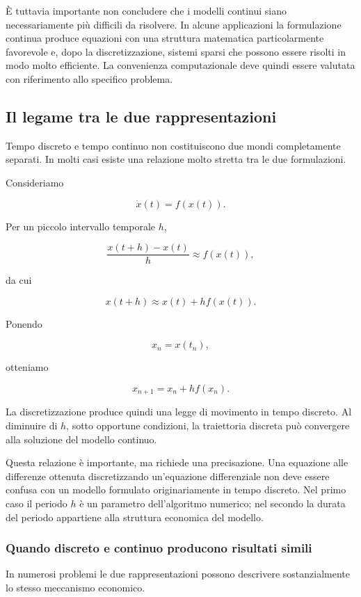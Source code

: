 \documentclass{book}
\begin{document}
È tuttavia importante non concludere che i modelli continui siano necessariamente più difficili da risolvere. In alcune applicazioni la formulazione continua produce equazioni con una struttura matematica particolarmente favorevole e, dopo la discretizzazione, sistemi sparsi che possono essere risolti in modo molto efficiente. La convenienza computazionale deve quindi essere valutata con riferimento allo specifico problema.

\subsection{Il legame tra le due rappresentazioni}

Tempo discreto e tempo continuo non costituiscono due mondi completamente separati. In molti casi esiste una relazione molto stretta tra le due formulazioni.

Consideriamo

$$
\dot x(t)=f(x(t)).
$$

Per un piccolo intervallo temporale $h$,

$$
\frac{x(t+h)-x(t)}{h}
\approx
f(x(t)),
$$

da cui

$$
x(t+h)
\approx
x(t)+h f(x(t)).
$$

Ponendo

$$
x_n=x(t_n),
$$

otteniamo

$$
x_{n+1}=x_n+h f(x_n).
$$

La discretizzazione produce quindi una legge di movimento in tempo discreto. Al diminuire di $h$, sotto opportune condizioni, la traiettoria discreta può convergere alla soluzione del modello continuo.

Questa relazione è importante, ma richiede una precisazione. Una equazione alle differenze ottenuta discretizzando un'equazione differenziale non deve essere confusa con un modello formulato originariamente in tempo discreto. Nel primo caso il periodo $h$ è un parametro dell'algoritmo numerico; nel secondo la durata del periodo appartiene alla struttura economica del modello.

\subsubsection{Quando discreto e continuo producono risultati simili}

In numerosi problemi le due rappresentazioni possono descrivere sostanzialmente lo stesso meccanismo economico.
\end{document}
